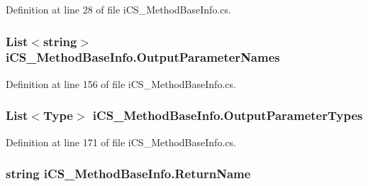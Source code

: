 Definition at line 28 of file i\+C\+S\+\_\+\+Method\+Base\+Info.\+cs.

\hypertarget{classi_c_s___method_base_info_ac7c0681e6d9a7bf8972b4f84f242db01}{
\subsubsection[{Output\+Parameter\+Names}]{\setlength{\rightskip}{0pt plus 5cm}List$<$string$>$ i\+C\+S\+\_\+\+Method\+Base\+Info.\+Output\+Parameter\+Names\hspace{0.3cm}{\ttfamily [get]}}}\label{classi_c_s___method_base_info_ac7c0681e6d9a7bf8972b4f84f242db01}


Definition at line 156 of file i\+C\+S\+\_\+\+Method\+Base\+Info.\+cs.

\hypertarget{classi_c_s___method_base_info_acf0e1ba1a5e873dce4fbd0666bbab4f9}{
\subsubsection[{Output\+Parameter\+Types}]{\setlength{\rightskip}{0pt plus 5cm}List$<${\bf Type}$>$ i\+C\+S\+\_\+\+Method\+Base\+Info.\+Output\+Parameter\+Types\hspace{0.3cm}{\ttfamily [get]}}}\label{classi_c_s___method_base_info_acf0e1ba1a5e873dce4fbd0666bbab4f9}


Definition at line 171 of file i\+C\+S\+\_\+\+Method\+Base\+Info.\+cs.

\hypertarget{classi_c_s___method_base_info_ad7ea43c3a367b2b1da935e2b895330a6}{
\subsubsection[{Return\+Name}]{\setlength{\rightskip}{0pt plus 5cm}string i\+C\+S\+\_\+\+Method\+Base\+Info.\+Return\+Name\hspace{0.3cm}{\ttfamily [get]}}}\label{classi_c_s___method_base_info_ad7ea43c3a367b2b1da935e2b895330a6}


